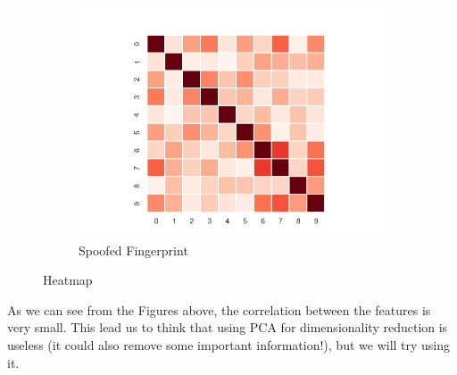 \documentclass[english]{report}
\begin{document}
\begin{figure}[h!]
\begin{subfigure}{0.3\textwidth}
        \label{fig:heatmap}
    \end{subfigure}
    \begin{subfigure}{0.3\textwidth}
        \includegraphics[scale=0.3]{../../images/feature_plot/heatmap_spoofedFingerprint_.png}
        \caption{Spoofed Fingerprint}
        
        \label{fig:heatmap}
    \end{subfigure}
    \centering
    \caption{Heatmap}
\end{figure}

As we can see from the Figures above, the correlation between the features is very small. 
This lead us to think that using PCA for dimensionality reduction is useless (it could
also remove some important information!), but we will try using it. \newline
\end{document}
